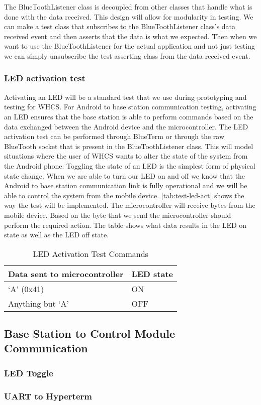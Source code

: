 The BlueToothListener class is decoupled from other classes that handle what is
done with the data received. This design will allow for modularity in testing.
We can make a test class that subscribes to the BlueToothListener class{}'s
data received event and then asserts that the data is what we expected. Then
when we want to use the BlueToothListener for the actual application and not
just testing we can simply unsubscribe the test asserting class from the data
received event.

\subsubsection{LED activation test}
Activating an LED will be a standard test that we use during prototyping and
testing for WHCS. For Android to base station communication testing, activating
an LED ensures that the base station is able to perform commands based on the
data exchanged between the Android device and the microcontroller. The LED
activation test can be performed through BlueTerm or through the raw BlueTooth
socket that is present in the BlueToothListener class. This will model
situations where the user of WHCS wants to alter the state of the system from
the Android phone. Toggling the state of an LED is the simplest form of
physical state change. When we are able to turn our LED on and off we know that
the Android to base station communication link is fully operational and we will
be able to control the system from the mobile device.  \autoref{tab:test-led-act}
shows the way the test will be implemented. The microcontroller will receive
bytes from the mobile device. Based on the byte that we send the
microcontroller should perform the required action. The table shows what data
results in the LED on state as well as the LED off state.

\begin{table}[H]
\centering
\begin{tabular}{|l|l|}
\hline
{\color{black} Data sent to microcontroller} &
{\color{black} LED state}\\\hline
{\color{black} {}`A{}' (0x41)} &
{\color{black} ON}\\\hline
{\color{black} Anything but {}`A{}'} &
{\color{black} OFF}\\\hline
\end{tabular}
\caption{LED Activation Test Commands}
\label{tab:test-led-act}
\end{table}

\subsection{Base Station to Control Module Communication}

\subsubsection{LED Toggle}

\subsubsection{UART to Hyperterm}

